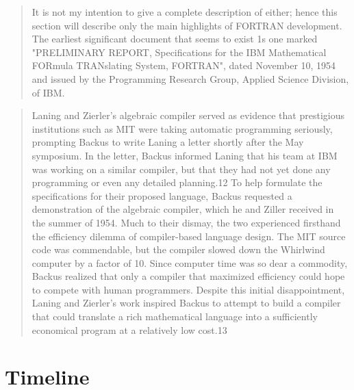   \begin{quotation}
    It is not my intention to give a complete description of either; hence this
    section will describe only the main highlights of FORTRAN development. The
    earliest significant document that seems to exist 1s one marked
    "PRELIMINARY REPORT, Specifications for the IBM Mathematical FORmula
    TRANslating System, FORTRAN", dated November 10, 1954 and issued by the
    Programming Research Group, Applied Science Division, of IBM.
    \cite{sammet_programming_languages_history_and_fundamentals_1969}
  \end{quotation}

  \begin{quotation}
    Laning and Zierler's algebraic compiler served as evidence that prestigious
    institutions such as MIT were taking automatic programming
    seriously, prompting
    Backus to write Laning a letter shortly after the May symposium.
    In the letter,
    Backus informed Laning that his team at IBM was working on a
    similar compiler,
    but that they had not yet done any programming or even any
    detailed planning.12
    To help formulate the specifications for their proposed language, Backus
    requested a demonstration of the algebraic compiler, which he and Ziller
    received in the summer of 1954. Much to their dismay, the two
    experienced firsthand the efficiency dilemma of compiler-based
    language design. The MIT
    source code was commendable, but the compiler slowed down the Whirlwind
    computer by a factor of 10. Since computer time was so dear a
    commodity, Backus
    realized that only a compiler that maximized efficiency could
    hope to compete
    with human programmers. Despite this initial disappointment, Laning and
    Zierler's work inspired Backus to attempt to build a compiler that could
    translate a rich mathematical language into a sufficiently
    economical program
    at a relatively low cost.13
    \cite{grace_hopper_and_the_invention_of_the_information_age_2009}
  \end{quotation}

  \pagebreak
  \section{Timeline}
  
